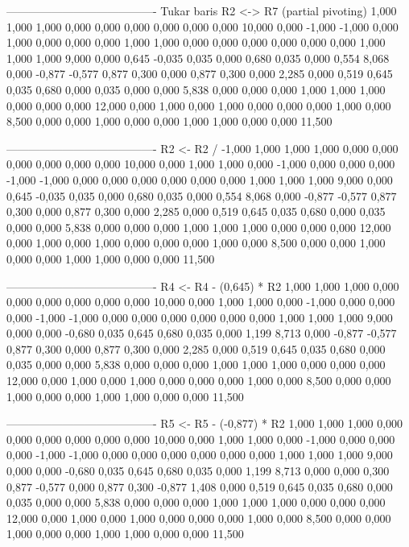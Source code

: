 \documentclass[12pt]{article}
\begin{document}
\begin{enumerate}
\begin{keluaran}
----------------------------------------
Tukar baris R2 <-> R7 (partial pivoting)
1,000   1,000   1,000   0,000   0,000   0,000   0,000   0,000   0,000   10,000
0,000   -1,000  -1,000  0,000   1,000   0,000   0,000   0,000   1,000   1,000
0,000   0,000   0,000   0,000   0,000   0,000   1,000   1,000   1,000   9,000
0,000   0,645   -0,035  0,035   0,000   0,680   0,035   0,000   0,554   8,068
0,000   -0,877  -0,577  0,877   0,300   0,000   0,877   0,300   0,000   2,285
0,000   0,519   0,645   0,035   0,680   0,000   0,035   0,000   0,000   5,838
0,000   0,000   0,000   1,000   1,000   1,000   0,000   0,000   0,000   12,000
0,000   1,000   0,000   1,000   0,000   0,000   0,000   1,000   0,000   8,500
0,000   0,000   1,000   0,000   0,000   1,000   1,000   0,000   0,000   11,500

----------------------------------------
R2 <- R2 / -1,000
1,000   1,000   1,000   0,000   0,000   0,000   0,000   0,000   0,000   10,000
0,000   1,000   1,000   0,000   -1,000  0,000   0,000   0,000   -1,000  -1,000
0,000   0,000   0,000   0,000   0,000   0,000   1,000   1,000   1,000   9,000
0,000   0,645   -0,035  0,035   0,000   0,680   0,035   0,000   0,554   8,068
0,000   -0,877  -0,577  0,877   0,300   0,000   0,877   0,300   0,000   2,285
0,000   0,519   0,645   0,035   0,680   0,000   0,035   0,000   0,000   5,838
0,000   0,000   0,000   1,000   1,000   1,000   0,000   0,000   0,000   12,000
0,000   1,000   0,000   1,000   0,000   0,000   0,000   1,000   0,000   8,500
0,000   0,000   1,000   0,000   0,000   1,000   1,000   0,000   0,000   11,500

----------------------------------------
R4 <- R4 - (0,645) * R2
1,000   1,000   1,000   0,000   0,000   0,000   0,000   0,000   0,000   10,000
0,000   1,000   1,000   0,000   -1,000  0,000   0,000   0,000   -1,000  -1,000
0,000   0,000   0,000   0,000   0,000   0,000   1,000   1,000   1,000   9,000
0,000   0,000   -0,680  0,035   0,645   0,680   0,035   0,000   1,199   8,713
0,000   -0,877  -0,577  0,877   0,300   0,000   0,877   0,300   0,000   2,285
0,000   0,519   0,645   0,035   0,680   0,000   0,035   0,000   0,000   5,838
0,000   0,000   0,000   1,000   1,000   1,000   0,000   0,000   0,000   12,000
0,000   1,000   0,000   1,000   0,000   0,000   0,000   1,000   0,000   8,500
0,000   0,000   1,000   0,000   0,000   1,000   1,000   0,000   0,000   11,500

----------------------------------------
R5 <- R5 - (-0,877) * R2
1,000   1,000   1,000   0,000   0,000   0,000   0,000   0,000   0,000   10,000
0,000   1,000   1,000   0,000   -1,000  0,000   0,000   0,000   -1,000  -1,000
0,000   0,000   0,000   0,000   0,000   0,000   1,000   1,000   1,000   9,000
0,000   0,000   -0,680  0,035   0,645   0,680   0,035   0,000   1,199   8,713
0,000   0,000   0,300   0,877   -0,577  0,000   0,877   0,300   -0,877  1,408
0,000   0,519   0,645   0,035   0,680   0,000   0,035   0,000   0,000   5,838
0,000   0,000   0,000   1,000   1,000   1,000   0,000   0,000   0,000   12,000
0,000   1,000   0,000   1,000   0,000   0,000   0,000   1,000   0,000   8,500
0,000   0,000   1,000   0,000   0,000   1,000   1,000   0,000   0,000   11,500


\end{keluaran}
\end{enumerate}
\end{document}
